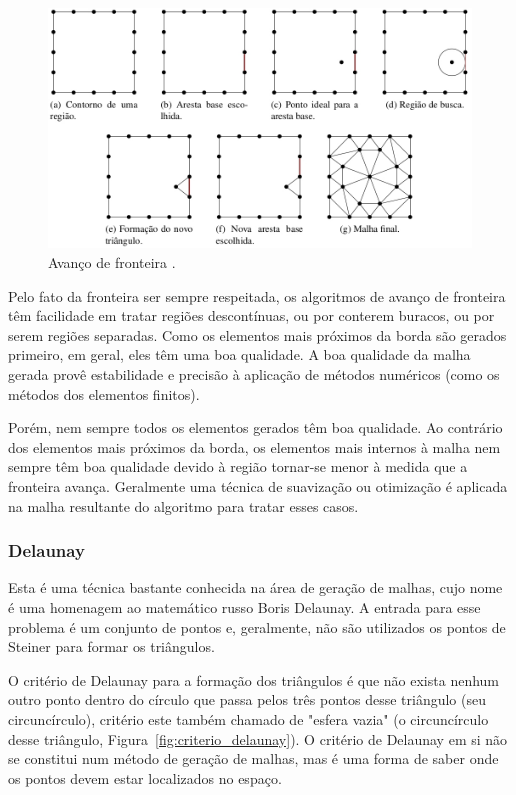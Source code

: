  \begin{figure}[htbp]
     \centering
     \includegraphics[width=1\textwidth]{fig/AF.jpg}
     \caption{Avanço de fronteira \cite{bib:Freitas10}.} 
     \label{fig:AF}
 \end{figure}

Pelo fato da fronteira ser sempre respeitada, os algoritmos de avanço de fronteira têm facilidade em tratar regiões descontínuas, ou por conterem buracos, ou por serem regiões separadas. Como os elementos mais próximos da borda são gerados primeiro, em geral, eles têm uma boa qualidade. A boa qualidade da malha gerada provê estabilidade e precisão à aplicação de métodos numéricos (como os métodos dos elementos finitos).

Porém, nem sempre todos os elementos gerados têm boa qualidade. Ao contrário dos elementos mais próximos da borda, os elementos mais internos à malha nem sempre têm boa qualidade devido à região tornar-se menor à medida que a fronteira avança. Geralmente uma técnica de suavização ou otimização é aplicada na malha resultante do algoritmo para tratar esses casos.

\subsubsection{Delaunay}

Esta é uma técnica bastante conhecida na área de geração de malhas, cujo nome é uma homenagem ao matemático russo Boris Delaunay. A entrada para esse problema é um conjunto de pontos e, geralmente, não são utilizados os pontos de Steiner para formar os triângulos.

O critério de Delaunay para a formação dos triângulos é que não exista nenhum outro ponto dentro do círculo que passa pelos três pontos desse triângulo (seu circuncírculo), critério este também chamado de "esfera vazia" (o circuncírculo desse triângulo, Figura~\ref{fig:criterio_delaunay}). O critério de Delaunay em si não se constitui num método de geração de malhas, mas é uma forma de saber onde os pontos devem estar localizados no espaço.

